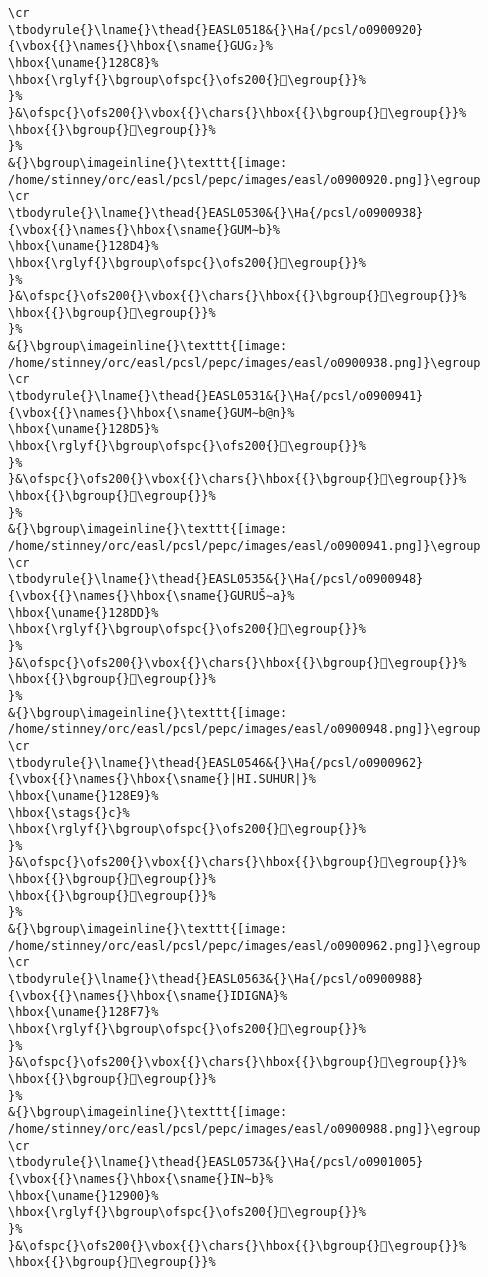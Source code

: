 \begin{verbatim}
\cr
\tbodyrule{}\lname{}\thead{}EASL0518&{}\Ha{/pcsl/o0900920}{\vbox{{}\names{}\hbox{\sname{}GUG₂}%
\hbox{\uname{}128C8}%
\hbox{\rglyf{}\bgroup\ofspc{}\ofs200{}𒣈\egroup{}}%
}%
}&\ofspc{}\ofs200{}\vbox{{}\chars{}\hbox{{}\bgroup{}𒣊\egroup{}}%
\hbox{{}\bgroup{}𒣈\egroup{}}%
}%
&{}\bgroup\imageinline{}\texttt{[image: /home/stinney/orc/easl/pcsl/pepc/images/easl/o0900920.png]}\egroup
\cr
\tbodyrule{}\lname{}\thead{}EASL0530&{}\Ha{/pcsl/o0900938}{\vbox{{}\names{}\hbox{\sname{}GUM∼b}%
\hbox{\uname{}128D4}%
\hbox{\rglyf{}\bgroup\ofspc{}\ofs200{}𒣔\egroup{}}%
}%
}&\ofspc{}\ofs200{}\vbox{{}\chars{}\hbox{{}\bgroup{}𒣔\egroup{}}%
\hbox{{}\bgroup{}𒣗\egroup{}}%
}%
&{}\bgroup\imageinline{}\texttt{[image: /home/stinney/orc/easl/pcsl/pepc/images/easl/o0900938.png]}\egroup
\cr
\tbodyrule{}\lname{}\thead{}EASL0531&{}\Ha{/pcsl/o0900941}{\vbox{{}\names{}\hbox{\sname{}GUM∼b@n}%
\hbox{\uname{}128D5}%
\hbox{\rglyf{}\bgroup\ofspc{}\ofs200{}𒣕\egroup{}}%
}%
}&\ofspc{}\ofs200{}\vbox{{}\chars{}\hbox{{}\bgroup{}𒣕\egroup{}}%
\hbox{{}\bgroup{}𒣖\egroup{}}%
}%
&{}\bgroup\imageinline{}\texttt{[image: /home/stinney/orc/easl/pcsl/pepc/images/easl/o0900941.png]}\egroup
\cr
\tbodyrule{}\lname{}\thead{}EASL0535&{}\Ha{/pcsl/o0900948}{\vbox{{}\names{}\hbox{\sname{}GURUŠ∼a}%
\hbox{\uname{}128DD}%
\hbox{\rglyf{}\bgroup\ofspc{}\ofs200{}𒣝\egroup{}}%
}%
}&\ofspc{}\ofs200{}\vbox{{}\chars{}\hbox{{}\bgroup{}𒣛\egroup{}}%
\hbox{{}\bgroup{}𒣝\egroup{}}%
}%
&{}\bgroup\imageinline{}\texttt{[image: /home/stinney/orc/easl/pcsl/pepc/images/easl/o0900948.png]}\egroup
\cr
\tbodyrule{}\lname{}\thead{}EASL0546&{}\Ha{/pcsl/o0900962}{\vbox{{}\names{}\hbox{\sname{}|HI.SUHUR|}%
\hbox{\uname{}128E9}%
\hbox{\stags{}c}%
\hbox{\rglyf{}\bgroup\ofspc{}\ofs200{}𒣩\egroup{}}%
}%
}&\ofspc{}\ofs200{}\vbox{{}\chars{}\hbox{{}\bgroup{}𒣧\egroup{}}%
\hbox{{}\bgroup{}𒣨\egroup{}}%
\hbox{{}\bgroup{}𒣩\egroup{}}%
}%
&{}\bgroup\imageinline{}\texttt{[image: /home/stinney/orc/easl/pcsl/pepc/images/easl/o0900962.png]}\egroup
\cr
\tbodyrule{}\lname{}\thead{}EASL0563&{}\Ha{/pcsl/o0900988}{\vbox{{}\names{}\hbox{\sname{}IDIGNA}%
\hbox{\uname{}128F7}%
\hbox{\rglyf{}\bgroup\ofspc{}\ofs200{}𒣷\egroup{}}%
}%
}&\ofspc{}\ofs200{}\vbox{{}\chars{}\hbox{{}\bgroup{}𒣸\egroup{}}%
\hbox{{}\bgroup{}𒣷\egroup{}}%
}%
&{}\bgroup\imageinline{}\texttt{[image: /home/stinney/orc/easl/pcsl/pepc/images/easl/o0900988.png]}\egroup
\cr
\tbodyrule{}\lname{}\thead{}EASL0573&{}\Ha{/pcsl/o0901005}{\vbox{{}\names{}\hbox{\sname{}IN∼b}%
\hbox{\uname{}12900}%
\hbox{\rglyf{}\bgroup\ofspc{}\ofs200{}𒤀\egroup{}}%
}%
}&\ofspc{}\ofs200{}\vbox{{}\chars{}\hbox{{}\bgroup{}𒤀\egroup{}}%
\hbox{{}\bgroup{}𒤁\egroup{}}%

\end{verbatim}
